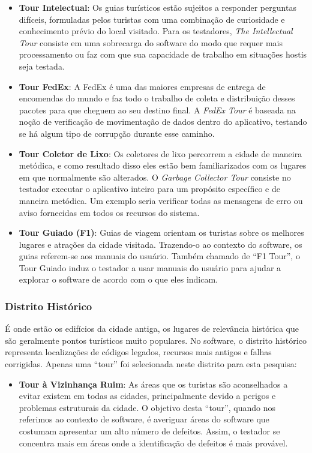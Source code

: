 \begin {itemize}
    \item \textbf {Tour Intelectual}: Os guias turísticos estão sujeitos a responder perguntas difíceis, formuladas pelos turistas com uma combinação de curiosidade e conhecimento prévio do local visitado. Para os testadores, \textit{The Intellectual Tour} consiste em uma sobrecarga do software do modo que requer mais processamento ou faz com que sua capacidade de trabalho em situações hostis seja testada.
    \item \textbf {Tour FedEx}: A FedEx é uma das maiores empresas de entrega de encomendas do mundo e faz todo o trabalho de coleta e distribuição desses pacotes para que cheguem ao seu destino final. A \textit{FedEx Tour} é baseada na noção de verificação de movimentação de dados dentro do aplicativo, testando se há algum tipo de corrupção durante esse caminho.

    \item \textbf {Tour Coletor de Lixo}: Os coletores de lixo percorrem a cidade de maneira metódica, e como resultado disso eles estão bem familiarizados com os lugares em que normalmente são alterados. O \textit{Garbage Collector Tour} consiste no testador executar o aplicativo inteiro para um propósito específico e de maneira metódica. Um exemplo seria verificar todas as mensagens de erro ou aviso fornecidas em todos os recursos do sistema.
    \item \textbf {Tour Guiado (F1)}: Guias de viagem orientam os turistas sobre os melhores lugares e atrações da cidade visitada. Trazendo-o ao contexto do software, os guias referem-se aos manuais do usuário. Também chamado de ``F1 Tour'', o Tour Guiado induz o testador a usar manuais do usuário para ajudar a explorar o software de acordo com o que eles indicam.
\end {itemize}

\subsubsection{Distrito Histórico}

É onde estão os edifícios da cidade antiga, os lugares de relevância histórica que são geralmente pontos turísticos muito populares. No software, o distrito histórico representa localizações de códigos legados, recursos mais antigos e falhas corrigidas. Apenas uma ``tour'' foi selecionada neste distrito para esta pesquisa:

\begin{itemize}
    \item \textbf {Tour à Vizinhança Ruim}: As áreas que os turistas são aconselhados a evitar existem em todas as cidades, principalmente devido a perigos e problemas estruturais da cidade. O objetivo desta ``tour'', quando nos referimos ao contexto de software, é averiguar áreas do software que costumam apresentar um alto número de defeitos. Assim, o testador se concentra mais em áreas onde a identificação de defeitos é mais provável.
\end{itemize}

